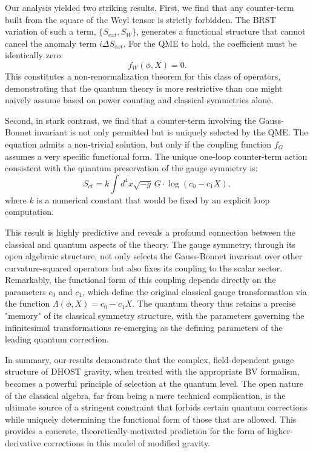 \documentclass[twocolumn]{aastex631}
\begin{document}
Our analysis yielded two striking results. First, we find that any counter-term built from the square of the Weyl tensor is strictly forbidden. The BRST variation of such a term, $\{S_{ext}, S_{W}\}$, generates a functional structure that cannot cancel the anomaly term $i\Delta S_{ext}$. For the QME to hold, the coefficient must be identically zero:
\begin{equation}
    f_W(\phi, X) = 0.
\end{equation}
This constitutes a non-renormalization theorem for this class of operators, demonstrating that the quantum theory is more restrictive than one might naively assume based on power counting and classical symmetries alone.

Second, in stark contrast, we find that a counter-term involving the Gauss-Bonnet invariant is not only permitted but is uniquely selected by the QME. The equation admits a non-trivial solution, but only if the coupling function $f_G$ assumes a very specific functional form. The unique one-loop counter-term action consistent with the quantum preservation of the gauge symmetry is:
\begin{equation}
    S_{ct} = k \int d^4x \sqrt{-g} \, G \cdot \log(c_0 - c_1 X),
    \label{eq:counterterm}
\end{equation}
where $k$ is a numerical constant that would be fixed by an explicit loop computation.

This result is highly predictive and reveals a profound connection between the classical and quantum aspects of the theory. The gauge symmetry, through its open algebraic structure, not only selects the Gauss-Bonnet invariant over other curvature-squared operators but also fixes its coupling to the scalar sector. Remarkably, the functional form of this coupling depends directly on the parameters $c_0$ and $c_1$, which define the original classical gauge transformation via the function $\Lambda(\phi, X) = c_0 - c_1 X$. The quantum theory thus retains a precise "memory" of its classical symmetry structure, with the parameters governing the infinitesimal transformations re-emerging as the defining parameters of the leading quantum correction.

In summary, our results demonstrate that the complex, field-dependent gauge structure of DHOST gravity, when treated with the appropriate BV formalism, becomes a powerful principle of selection at the quantum level. The open nature of the classical algebra, far from being a mere technical complication, is the ultimate source of a stringent constraint that forbids certain quantum corrections while uniquely determining the functional form of those that are allowed. This provides a concrete, theoretically-motivated prediction for the form of higher-derivative corrections in this model of modified gravity.
\end{document}
